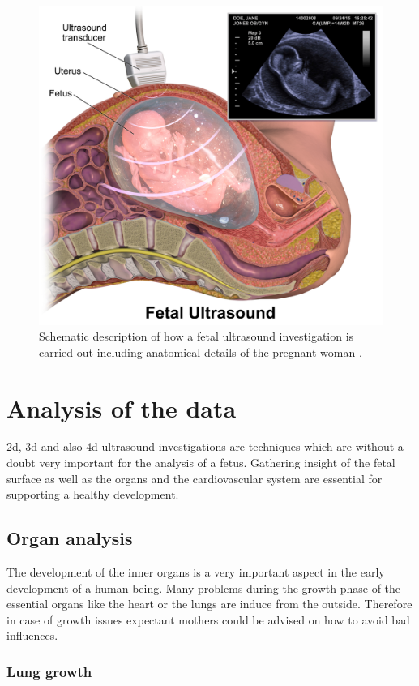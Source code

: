 \begin{figure} [htb!]
    \centering
	\includegraphics[width=12cm]{content/images/Fetal_Ultrasound}
	\caption{Schematic description of how a fetal ultrasound investigation is carried out including anatomical details of the pregnant woman \cite{BruceBlausFetalUltrasound}.}
	\label{Fetal_Ultrasound}
\end{figure}

\section{Analysis of the data}
\gls{2d}, \gls{3d} and also \gls{4d} ultrasound investigations are techniques which are without a doubt very important for the analysis of a fetus. Gathering insight of the fetal surface as well as the organs and the cardiovascular system are essential for supporting a healthy development.

\subsection{Organ analysis}

The development of the inner organs is a very important aspect in the early development of a human being. Many problems during the growth phase of the essential organs like the heart or the lungs are induce from the outside. Therefore in case of growth issues expectant mothers could be advised on how to avoid bad influences.

\subsubsection{Lung growth}

